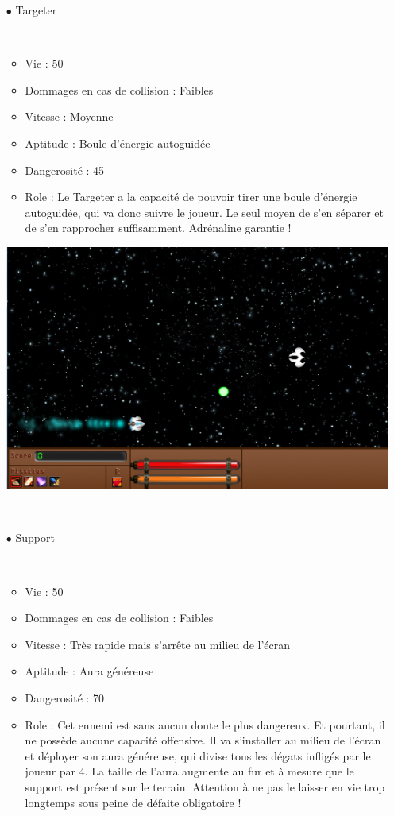 \begin{itemize}
				\par~
				\item[$\bullet$ Targeter]
				\par~
				\begin{itemize}
					\item Vie : 50
					\item Dommages en cas de collision : Faibles
					\item Vitesse : Moyenne
					\item Aptitude : Boule d'énergie autoguidée
					\item Dangerosité : 45%
					\item Role : Le Targeter a la capacité de pouvoir tirer une boule d'énergie autoguidée, qui va donc suivre le joueur. Le seul moyen de s'en séparer et de s'en rapprocher suffisamment. Adrénaline garantie !
				\end{itemize}
\includegraphics{images/vaisseaux/targeter.png}
				\par~
				\item[$\bullet$ Support]
				\par~
				\begin{itemize}
					\item Vie : 50
					\item Dommages en cas de collision : Faibles
					\item Vitesse : Très rapide mais s'arrête au milieu de l'écran
					\item Aptitude : Aura généreuse
					\item Dangerosité : 70%
					\item Role : Cet ennemi est sans aucun doute le plus dangereux. Et pourtant, il ne possède aucune capacité offensive. Il va s'installer au milieu de l'écran et déployer son aura généreuse, qui divise tous les dégats infligés par le joueur par 4. La taille de l'aura augmente au fur et à mesure que le support est présent sur le terrain. Attention à ne pas le laisser en vie trop longtemps sous peine de défaite obligatoire !

\end{itemize}
\end{itemize}
